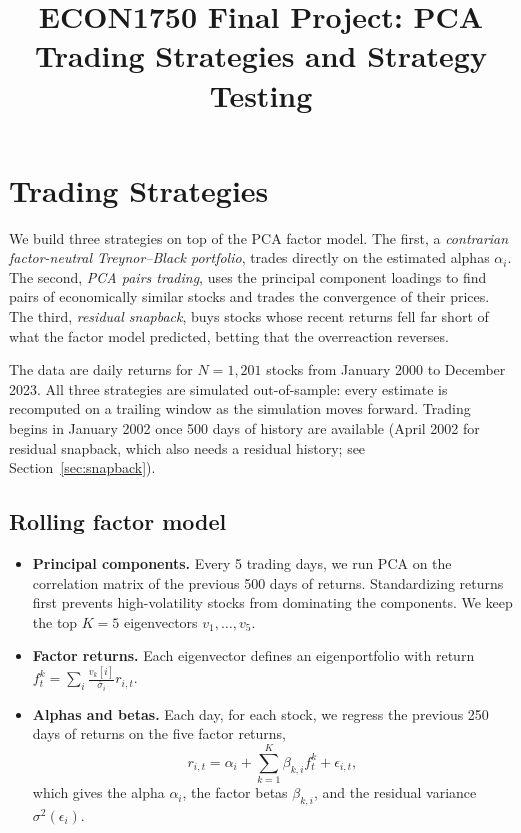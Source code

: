 \documentclass[11pt]{article}
\title{ECON1750 Final Project: PCA Trading Strategies and Strategy Testing}
\date{}
\begin{document}
\maketitle

\section{Trading Strategies}

We build three strategies on top of the PCA factor model. The first, a \emph{contrarian factor-neutral Treynor--Black portfolio}, trades directly on the estimated alphas $\alpha_i$. The second, \emph{PCA pairs trading}, uses the principal component loadings to find pairs of economically similar stocks and trades the convergence of their prices. The third, \emph{residual snapback}, buys stocks whose recent returns fell far short of what the factor model predicted, betting that the overreaction reverses.

The data are daily returns for $N = 1{,}201$ stocks from January 2000 to December 2023. All three strategies are simulated out-of-sample: every estimate is recomputed on a trailing window as the simulation moves forward. Trading begins in January 2002 once 500 days of history are available (April 2002 for residual snapback, which also needs a residual history; see Section~\ref{sec:snapback}).

\subsection{Rolling factor model}

\begin{itemize}
    \item \textbf{Principal components.} Every 5 trading days, we run PCA on the correlation matrix of the previous 500 days of returns. Standardizing returns first prevents high-volatility stocks from dominating the components. We keep the top $K = 5$ eigenvectors $v_1, \dots, v_5$.
    \item \textbf{Factor returns.} Each eigenvector defines an eigenportfolio with return $f^k_t = \sum_i \frac{v_k[i]}{\bar\sigma_i} r_{i,t}$.
    \item \textbf{Alphas and betas.} Each day, for each stock, we regress the previous 250 days of returns on the five factor returns,
    \[
        r_{i,t} = \alpha_i + \sum_{k=1}^{K} \beta_{k,i} f^k_t + \epsilon_{i,t},
    \]
    which gives the alpha $\alpha_i$, the factor betas $\beta_{k,i}$, and the residual variance $\sigma^2(\epsilon_i)$.
\end{itemize}
\end{document}
